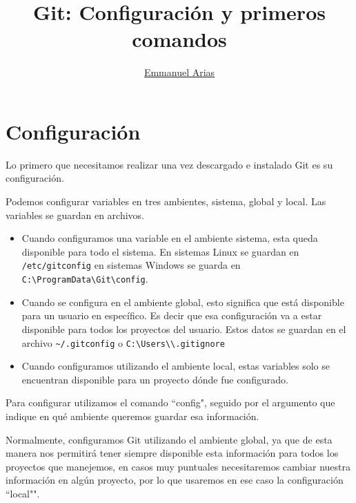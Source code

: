 \documentclass[a4paper]{article}
\begin{document}
	\title{\vspace{5cm}
	\Huge Git: Configuración y primeros comandos
	}
	
	\vspace{5cm}

	\author{\Large \href{mailto:emmanuelarias@gmail.com}{Emmanuel Arias}}	
	
	\vspace{5cm}

	\date{}

	\maketitle
	
	\newpage
	
\section{Configuración} %
\label{sec:configuracion}
Lo primero que necesitamos realizar una vez descargado e instalado
Git es su configuración.

Podemos configurar variables en tres ambientes, sistema, global y local.
Las variables se guardan en archivos.

\begin{itemize}
	\item Cuando configuramos una variable en el ambiente sistema, esta queda
	disponible para todo el sistema.  En sistemas Linux se guardan en 
	\verb|/etc/gitconfig| en sistemas Windows se guarda en
	\verb|C:\ProgramData\Git\config|.
	\item Cuando se configura en el ambiente global, esto significa que está
	disponible para un usuario en específico. Es decir que esa configuración
	va a estar disponible para todos los proyectos del usuario. Estos datos
	se guardan en el archivo \verb|~/.gitconfig| o \verb|C:\Users\\.gitignore|
	\item Cuando configuramos utilizando el ambiente local, estas variables solo
	se encuentran disponible para un proyecto dónde fue configurado.
\end{itemize}

Para configurar utilizamos el comando ``config", seguido por el argumento que
indique en qué ambiente queremos guardar esa información.

Normalmente, configuramos Git utilizando el ambiente global, ya que de esta
manera nos permitirá tener siempre disponible esta información para todos 
los proyectos que manejemos, en casos muy puntuales necesitaremos cambiar nuestra
información en algún proyecto, por lo que usaremos en ese caso la configuración 
``local"".
\end{document}
